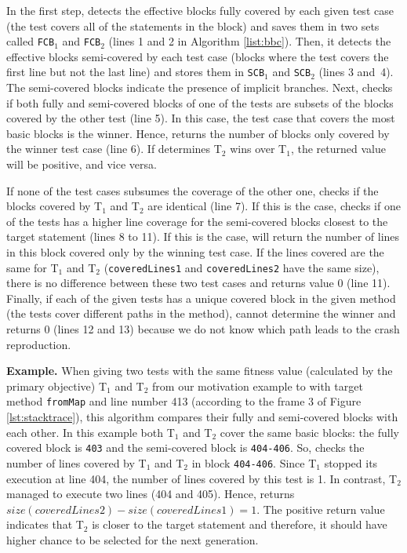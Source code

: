 In the first step, \bbc detects the effective blocks fully covered by each given test case (\ie the test covers all of the statements in the block) and saves them in two sets called \texttt{FCB$_1$} and \texttt{FCB$_2$} (lines 1 and 2 in Algorithm \ref{list:bbc}). Then, it detects the effective blocks semi-covered by each test case (\ie blocks where the test covers the first line but not the last line) and stores them in \texttt{SCB$_1$} and \texttt{SCB$_2$} (lines 3 and~4). 
The semi-covered blocks indicate the presence of implicit branches. Next, \bbc checks if both fully and semi-covered blocks of one of the tests are subsets of the blocks covered by the other test (line 5). In this case, the test case that covers the most basic blocks is the winner. Hence, \bbc returns the number of blocks only covered by the winner test case (line 6). If \bbc determines T$_2$ wins over T$_1$, the returned value will be positive, and vice versa. 

If none of the test cases subsumes the coverage of the other one, \bbc checks if the blocks covered by T$_1$ and T$_2$ are identical (line 7). If this is the case, \bbc checks if one of the tests has a higher line coverage for the semi-covered blocks closest to the target statement (lines 8 to 11). If this is the case, \bbc will return the number of lines in this block covered only by the winning test case. If the lines covered are the same for T$_1$ and T$_2$ (\ie \texttt{coveredLines1} and \texttt{coveredLines2} have the same size), there is no difference between these two test cases and \bbc returns value 0 (line 11).
Finally, if each of the given tests has a unique covered block in the given method (\ie the tests cover different paths in the method), \bbc cannot determine the winner and returns 0 (lines 12 and 13) because we do not know which path leads to the crash reproduction.

\textbf{Example. } 
%
When giving two tests with the same fitness value (calculated by the primary objective) T$_1$ and T$_2$ from our motivation example to \bbc with target method \texttt{fromMap} and line number 413 (according to the frame 3 of Figure \ref{lst:stacktrace}), this algorithm compares their fully and semi-covered blocks with each other. 
In this example both T$_1$ and T$_2$ cover the same basic blocks: the fully covered block is \texttt{403} and the semi-covered block is \texttt{404-406}. So, \bbc checks the number of lines covered by T$_1$ and T$_2$ in block \texttt{404-406}. Since T$_1$ stopped its execution at line 404, the number of lines covered by this test is 1. In contrast, T$_2$ managed to execute two lines (404 and 405). Hence, \bbc returns $size(coveredLines2) - size(coveredLines1) = 1$. The positive return value indicates that T$_2$ is closer to the target statement and therefore, it should have higher chance to be selected for the next generation.

